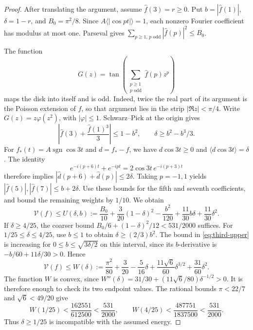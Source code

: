 \documentclass[11pt,reqno]{amsart}
\numberwithin{equation}{section}
\theoremstyle{definition}
\theoremstyle{remark}
\newcommand{\V}{\mathcal V}
\newcommand{\ac}[1]{\langle #1\rangle}
\DeclareMathOperator{\sgn}{sgn}
\begin{document}
\begin{proof}
After translating the argument, assume $\widehat f(3)=r\ge0$. Put $b=|\widehat f(1)|$, $\delta=1-r$, and $B_0=\pi^2/8$. Since $A\ac{|\cos pt|}=1$, each nonzero Fourier coefficient has modulus at most one. Parseval gives $\sum_{p\ge1,\,p\text{ odd}}|\widehat f(p)|^2\le B_0$.

The function
\[
 G(z)=\tan\left(\sum_{\substack{p\ge1\\p\text{ odd}}}\widehat f(p)z^p\right)
\]
maps the disk into itself and is odd. Indeed, twice the real part of its argument is the Poisson extension of $f$, so that argument lies in the strip $|\Re z|<\pi/4$. Write $G(z)=z\varphi(z^2)$, with $|\varphi|\le1$. Schwarz--Pick at the origin gives
\[
 \left|\widehat f(3)+\frac{\widehat f(1)^3}{3}\right|\le1-b^2,
 \qquad \delta\ge b^2-b^3/3.
\]
For $f_*(t)=A\sgn\cos3t$ and $d=f_*-f$, we have $d\cos3t\ge0$ and $\ac{d\cos3t}=\delta$. The identity
\[
 e^{-i(p+6)t}+e^{-ipt}=2\cos3t\,e^{-i(p+3)t}
\]
therefore implies $|\widehat d(p+6)+\widehat d(p)|\le2\delta$. Taking $p=-1,1$ yields $|\widehat f(5)|,|\widehat f(7)|\le b+2\delta$. Use these bounds for the fifth and seventh coefficients, and bound the remaining weights by $1/10$. We obtain
\begin{equation}\label{eq:third-upper}
 \V(f)\le U(\delta,b):=
 \frac{B_0}{10}+\frac3{20}(1-\delta)^2
 -\frac{b^2}{120}+\frac{11}{30}b\delta+\frac{11}{30}\delta^2.
\end{equation}
If $\delta\ge4/25$, the coarser bound $B_0/6+(1-\delta)^2/12<531/2000$ suffices. For $1/25\le\delta\le4/25$, use $b\le1$ to obtain $\delta\ge(2/3)b^2$. The bound in \eqref{eq:third-upper} is increasing for $0\le b\le\sqrt{3\delta/2}$ on this interval, since its $b$-derivative is $-b/60+11\delta/30>0$. Hence
\begin{equation}\label{eq:scalar-W}
 \V(f)\le W(\delta):=\frac{\pi^2}{80}+\frac3{20}-\frac5{16}\delta
 +\frac{11\sqrt6}{60}\delta^{3/2}+\frac{31}{60}\delta^2.
\end{equation}
The function $W$ is convex, since $W''(\delta)=31/30+(11\sqrt6/80)\delta^{-1/2}>0$. It is therefore enough to check its two endpoint values. The rational bounds $\pi<22/7$ and $\sqrt6<49/20$ give
\[
 W(1/25)<\frac{162551}{612500}<\frac{531}{2000},\qquad
 W(4/25)<\frac{487751}{1837500}<\frac{531}{2000}.
\]
Thus $\delta\ge1/25$ is incompatible with the assumed energy.
\end{proof}
\end{document}
